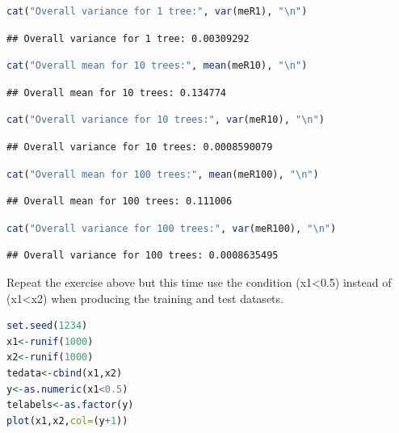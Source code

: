 \documentclass[
]{article}
\begin{document}
\begin{lstlisting}[language=R]
cat("Overall variance for 1 tree:", var(meR1), "\n")
\end{lstlisting}

\begin{lstlisting}
## Overall variance for 1 tree: 0.00309292
\end{lstlisting}

\begin{lstlisting}[language=R]
cat("Overall mean for 10 trees:", mean(meR10), "\n")
\end{lstlisting}

\begin{lstlisting}
## Overall mean for 10 trees: 0.134774
\end{lstlisting}

\begin{lstlisting}[language=R]
cat("Overall variance for 10 trees:", var(meR10), "\n")
\end{lstlisting}

\begin{lstlisting}
## Overall variance for 10 trees: 0.0008590079
\end{lstlisting}

\begin{lstlisting}[language=R]
cat("Overall mean for 100 trees:", mean(meR100), "\n")
\end{lstlisting}

\begin{lstlisting}
## Overall mean for 100 trees: 0.111006
\end{lstlisting}

\begin{lstlisting}[language=R]
cat("Overall variance for 100 trees:", var(meR100), "\n")
\end{lstlisting}

\begin{lstlisting}
## Overall variance for 100 trees: 0.0008635495
\end{lstlisting}

Repeat the exercise above but this time use the condition
(x1\textless0.5) instead of (x1\textless x2) when producing the training
and test datasets.

\begin{lstlisting}[language=R]
set.seed(1234)
x1<-runif(1000)
x2<-runif(1000)
tedata<-cbind(x1,x2)
y<-as.numeric(x1<0.5)
telabels<-as.factor(y)
plot(x1,x2,col=(y+1))
\end{lstlisting}
\end{document}

